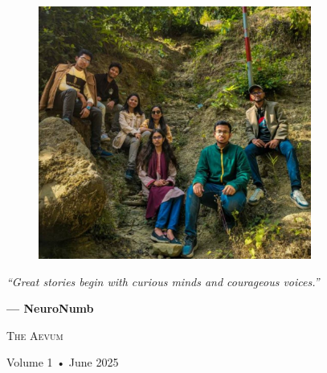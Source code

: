 \documentclass[a4paper,10pt,twocolumn]{memoir}
\begin{document}
\begin{figure}[ht]
  \hspace{2.0cm}
  \includegraphics[width=0.8\textwidth]{group_photo.jpg}
\end{figure}

\clearpage
\thispagestyle{empty}
\begin{center}
\begin{minipage}{\textwidth}
\centering
\vspace*{\fill}
\vspace{8.5cm}

{\Large\itshape\color{primary}``Great stories begin with curious minds and courageous voices.''}

\vspace{0.8em} %
{\large\bfseries\color{dark}— NeuroNumb}

\vspace{1.5cm} %

\vspace{0.8em} %
{\large\scshape\color{dark}The Aevum}

\vspace{0.3em} %
{\small\color{gray}Volume 1 • June 2025}

\vspace{0.3em} %

\vspace*{\fill}
\end{minipage}
\end{center}
\end{document}
